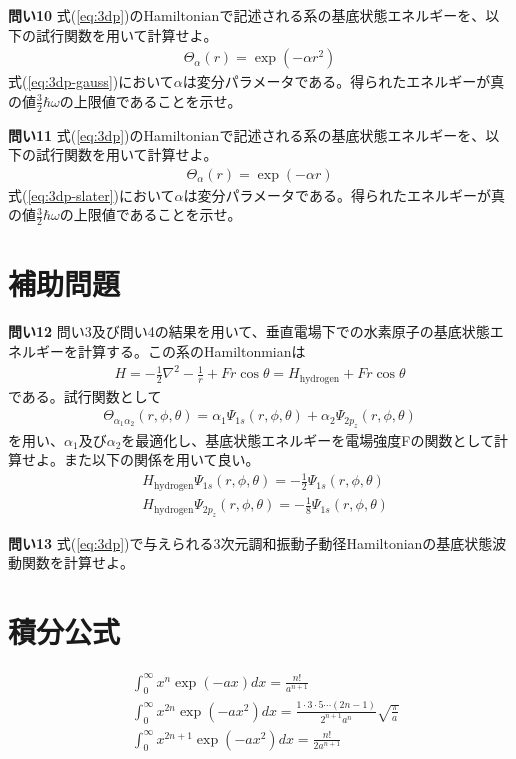 \documentclass[11pt,pra,aps]{revtex4}
\begin{document}
\noindent
{\bf 問い10} 式(\ref{eq:3dp})のHamiltonianで記述される系の基底状態エネルギーを、以下の試行関数を用いて計算せよ。
\begin{align}
  \Theta_\alpha(r)=\exp(-\alpha r^2) \label{eq:3dp-gauss}
\end{align}
式(\ref{eq:3dp-gauss})において$\alpha$は変分パラメータである。得られたエネルギーが真の値$\frac{3}{2}\hbar\omega$の上限値であることを示せ。

\noindent
{\bf 問い11} 式(\ref{eq:3dp})のHamiltonianで記述される系の基底状態エネルギーを、以下の試行関数を用いて計算せよ。
\begin{align}
  \Theta_\alpha(r)=\exp(-\alpha r) \label{eq:3dp-slater}
\end{align}
式(\ref{eq:3dp-slater})において$\alpha$は変分パラメータである。得られたエネルギーが真の値$\frac{3}{2}\hbar\omega$の上限値であることを示せ。

\section{補助問題}

\noindent
{\bf 問い12} 問い3及び問い4の結果を用いて、垂直電場下での水素原子の基底状態エネルギーを計算する。この系のHamiltonmianは
\begin{align}
  H=-\frac{1}{2}\nabla^2-\frac{1}{r}+Fr\cos\theta=H_\text{hydrogen}+Fr\cos\theta
\end{align}
である。試行関数として
\begin{align}
  \Theta_{\alpha_1\alpha_2}(r,\phi,\theta)=\alpha_1\Psi_{1s}(r,\phi,\theta)+\alpha_2\Psi_{2p_z}(r,\phi,\theta)
\end{align}
を用い、$\alpha_1$及び$\alpha_2$を最適化し、基底状態エネルギーを電場強度Fの関数として計算せよ。また以下の関係を用いて良い。
\begin{align}
  &H_\text{hydrogen}\Psi_{1s}(r,\phi,\theta)=-\frac{1}{2}\Psi_{1s}(r,\phi,\theta) \\
  &H_\text{hydrogen}\Psi_{2p_z}(r,\phi,\theta)=-\frac{1}{8}\Psi_{1s}(r,\phi,\theta)
\end{align}

\noindent
{\bf 問い13} 式(\ref{eq:3dp})で与えられる3次元調和振動子動径Hamiltonianの基底状態波動関数を計算せよ。

\section{積分公式}

\begin{align}
  &\int_0^\infty x^n \exp(-ax) dx = \frac{n!}{a^{n+1}} \\
  &\int_0^\infty x^{2n} \exp(-ax^2) dx = \frac{1\cdot3\cdot5\cdots(2n-1)}{2^{n+1}a^n}\sqrt{\frac{\pi}{a}} \\
  &\int_0^\infty x^{2n+1} \exp(-ax^2) dx = \frac{n!}{2 a^{n+1}}
\end{align}
\end{document}
